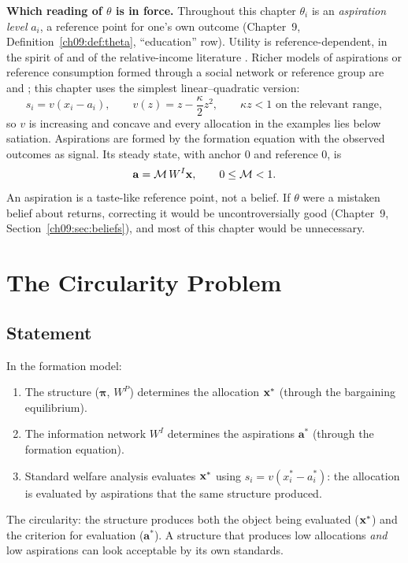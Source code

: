 \documentclass[../structural_economics_book.tex]{subfiles}
\begin{document}
\textbf{Which reading of $\theta$ is in force.} Throughout this chapter $\theta_i$ is an \textit{aspiration level} $a_i$, a reference point for one's own outcome (Chapter~9, Definition~\ref{ch09:def:theta}, ``education'' row). Utility is reference-dependent, in the spirit of \citet{genicot2017aspirations} and of the relative-income literature \citep{clark2008relative}. Richer models of aspirations or reference consumption formed through a social network or reference group are \citet{mookherjee2010aspirations} and \citet{ghiglino2010keeping}; this chapter uses the simplest linear--quadratic version:
\begin{equation}\label{ch12:eq:refdep}
s_i = v(x_i - a_i), \qquad v(z) = z - \frac{\kappa}{2}z^2, \qquad \kappa z < 1 \text{ on the relevant range},
\end{equation}
so $v$ is increasing and concave and every allocation in the examples lies below satiation. Aspirations are formed by the formation equation with the observed outcomes as signal. Its steady state, with anchor $0$ and reference $0$, is
\begin{equation}\label{ch12:eq:aspiration}
\mathbf{a} = \mathcal{M}\,W^I\mathbf{x}, \qquad 0 \le \mathcal{M} < 1 .
\end{equation}
An aspiration is a taste-like reference point, not a belief. If $\theta$ were a mistaken belief about returns, correcting it would be uncontroversially good (Chapter~9, Section~\ref{ch09:sec:beliefs}), and most of this chapter would be unnecessary.


\section{The Circularity Problem}
\label{ch12:sec:circularity}

\subsection{Statement}

\begin{definition}\label{ch12:def:circularity}
In the formation model:
\begin{enumerate}
\item The structure ($\boldsymbol{\pi}$, $W^P$) determines the allocation $\mathbf{x}^*$ (through the bargaining equilibrium).
\item The information network $W^I$ determines the aspirations $\mathbf{a}^*$ (through the formation equation).
\item Standard welfare analysis evaluates $\mathbf{x}^*$ using $s_i = v(x_i^* - a_i^*)$: the allocation is evaluated by aspirations that the same structure produced.
\end{enumerate}
The circularity: the structure produces both the object being evaluated ($\mathbf{x}^*$) and the criterion for evaluation ($\mathbf{a}^*$). A structure that produces low allocations \textit{and} low aspirations can look acceptable by its own standards.
\end{definition}
\end{document}
